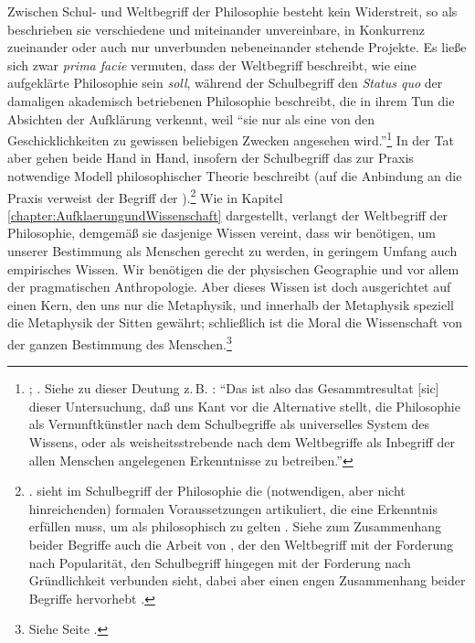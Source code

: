 Zwischen Schul- und Weltbegriff der Philosophie besteht kein Widerstreit, so als
beschrieben sie verschiedene und miteinander unvereinbare, in Konkurrenz
zueinander oder auch nur unverbunden nebeneinander stehende Projekte.
Es ließe sich zwar \emph{prima facie} vermuten, dass der Weltbegriff beschreibt,
wie eine aufgeklärte Philosophie sein \emph{soll}, während der Schulbegriff den \emph{Status quo}
der damaligen akademisch betriebenen Philosophie beschreibt, die in ihrem Tun
die Absichten der Aufklärung verkennt, weil \enquote{sie nur als eine von den
Geschicklichkeiten zu gewissen beliebigen Zwecken angesehen
wird.}\footnote{\cite[][B 867]{Kant:KritikderreinenVernunft2003}; \cite[][III:
543.33--34]{Kant:GesammelteWerke1900ff.}. Siehe zu dieser Deutung z.\,B.
\cite[][481]{Doering:UeberKantsLehrevonBegriffundAufgabederPhilosophie1885}:
\enquote{Das ist also das Gesammtresultat [sic] dieser Untersuchung, daß uns
Kant vor die Alternative stellt, die Philosophie als Vernunftkünstler nach dem
Schulbegriffe als universelles System des Wissens, oder als weisheitsstrebende
nach dem Weltbegriffe als Inbegriff der allen Menschen angelegenen Erkenntnisse
zu betreiben.}} In der Tat aber gehen beide Hand in Hand, insofern der
Schulbegriff das zur Praxis notwendige Modell philosophischer Theorie beschreibt
(auf die Anbindung an die Praxis verweist der Begriff der
).\footnote{\cite[Vgl.][89]{Kleinhans:DerenquotePhilosophinderneuerenGeschichtederPhilosophie1999}.
 sieht im
Schulbegriff der Philosophie die (notwendigen, aber nicht hinreichenden) formalen Voraussetzungen
artikuliert, die eine Erkenntnis erfüllen muss, um als philosophisch zu
gelten \parencite[vgl.][467]{Trawny:DasIdealdesWeisen2008}. Siehe zum
Zusammenhang beider Begriffe auch die Arbeit von
, der den Weltbegriff mit der
Forderung nach Popularität, den Schulbegriff hingegen mit der Forderung nach
Gründlichkeit verbunden sieht, dabei aber einen engen Zusammenhang beider
Begriffe hervorhebt \parencite[vgl.][183--190]{Boehr:PhilosophiefuerdieWelt2003}.}
Wie in Kapitel \ref{chapter:AufklaerungundWissenschaft} dargestellt, verlangt
der Weltbegriff der Philosophie, demgemäß sie dasjenige Wissen vereint, dass wir
benötigen, um unserer Bestimmung als Menschen gerecht zu werden, in geringem
Umfang auch empirisches Wissen. Wir benötigen die  der
physischen Geographie und vor allem der pragmatischen Anthropologie. Aber dieses
Wissen ist doch ausgerichtet auf einen Kern, den uns nur die Metaphysik, und innerhalb der
Metaphysik speziell die Metaphysik der Sitten gewährt; schließlich ist die Moral
die Wissenschaft von der ganzen Bestimmung des Menschen.\footnote{Siehe Seite
\pageref{Anmerkung:GanzeBestimmung}.}


